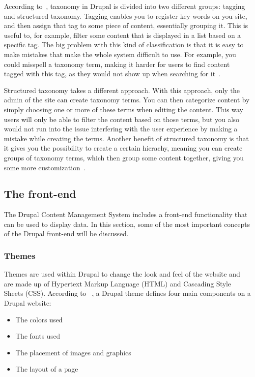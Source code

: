 According to~\textcite{Tomlinson2015}, taxonomy in Drupal is divided into two different groups: tagging and structured taxonomy. Tagging enables you to register key words on you site, and then assign that tag to some piece of content, essentially grouping it. This is useful to, for example, filter some content that is displayed in a list based on a specific tag. The big problem with this kind of classification is that it is easy to make mistakes that make the whole system difficult to use. For example, you could misspell a taxonomy term, making it harder for users to find content tagged with this tag, as they would not show up when searching for it~\autocite{Tomlinson2015}.

Structured taxonomy takes a different approach. With this approach, only the admin of the site can create taxonomy terms. You can then categorize content by simply choosing one or more of these terms when editing the content. This way users will only be able to filter the content based on those terms, but you also would not run into the issue interfering with the user experience by making a mistake while creating the terms. Another benefit of structured taxonomy is that it gives you the possibility to create a certain hierachy, meaning you can create groups of taxonomy terms, which then group some content together, giving you some more customization~\autocite{Tomlinson2015}.


\subsection{The front-end}

The Drupal Content Management System includes a front-end functionality that can be used to display data. In this section, some of the most important concepts of the Drupal front-end will be discussed.

\subsubsection{Themes}

Themes are used within Drupal to change the look and feel of the website and are made up of Hypertext Markup Language (HTML) and Cascading Style Sheets (CSS). According to ~\textcite{Tomlinson2015}, a Drupal theme defines four main components on a Drupal website: 

\begin{itemize}
	\item  The colors used
	\item  The fonts used
	\item  The placement of images and graphics
	\item  The layout of a page
\end{itemize}


